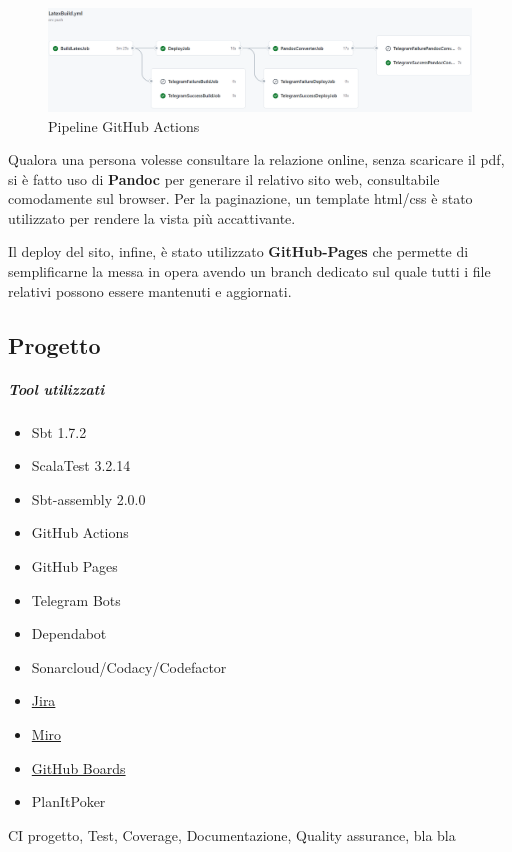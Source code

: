         \begin{figure}[H]
            \caption{Pipeline GitHub Actions}
            \label{fig:ci-github}
            \centering
            \includegraphics[width=1\textwidth]{Images/gh-pipeline.png}
        \end{figure}

        Qualora una persona volesse consultare la relazione online, senza scaricare il pdf, si è fatto uso di \textbf{Pandoc} per generare il relativo sito web, consultabile comodamente sul browser. Per la paginazione, un template html/css è stato utilizzato per rendere la vista più accattivante.

        Il deploy del sito, infine, è stato utilizzato \textbf{GitHub-Pages} che permette di semplificarne la messa in opera avendo un branch dedicato sul quale tutti i file relativi possono essere mantenuti e aggiornati.
        

    \subsection{Progetto}
        \subparagraph{Tool utilizzati}
        \begin{itemize}
            \item Sbt 1.7.2
            \item ScalaTest 3.2.14
            \item Sbt-assembly 2.0.0
            \item GitHub Actions
            \item GitHub Pages
            \item Telegram Bots
            \item Dependabot
            \item Sonarcloud/Codacy/Codefactor
            \item \href{https://riccardo-omiccioli.atlassian.net/jira/software/projects/IQ/boards/1/roadmap}{Jira}
            \item \href{https://miro.com/app/board/uXjVPN93uLs=/?share_link_id=56431555728}{Miro}
            \item \href{https://github.com/orgs/ISIQuiz/projects/3}{GitHub Boards}
            \item PlanItPoker \cite{planitpoker}
        \end{itemize}
    CI progetto, Test, Coverage, Documentazione, Quality assurance, bla bla

